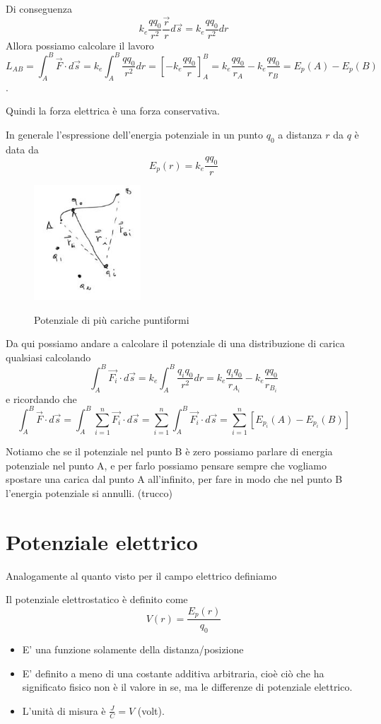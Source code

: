 Di conseguenza 
$$ k_e \frac{qq_0}{r^2}\frac{\vec{r}}{r}d\vec{s}=k_e \frac{qq_0}{r^2}dr$$
Allora possiamo calcolare il lavoro
$$L_{AB}=\int_{A}^{B}\vec{F}\cdot d\vec{s}=k_e \int_{A}^{B}\frac{qq_0}{r^2}dr=\left[ -k_e \frac{qq_0}{r}\right] _A ^B = k_e \frac{qq_0}{r_A}-k_e \frac{qq_0}{r_B}=E_p (A)-E_p(B)$$.

Quindi la forza elettrica è una forza conservativa.

In generale l'espressione dell'energia potenziale in un punto $q_0$ a distanza $r$ da $q$ è data da 
$$E_p (r) =k_e \frac{qq_0}{r}$$

\begin{figure}[h]
	\begin{center}
		\includegraphics[width=4cm]{lezione8/images/3 Elettrostatica, Il potenziale elettrico}\\
		\caption{Potenziale di più cariche puntiformi}
	\end{center}
\end{figure}

Da qui possiamo andare a calcolare il potenziale di una distribuzione di carica qualsiasi calcolando 
$$\int_{A}^{B}\vec{F_i}\cdot d\vec{s}=k_e \int_{A}^{B}\frac{q_i q_0}{r^2}dr = k_e \frac{q_i q_0}{r_{A_i}}-k_e \frac{qq_0}{r_{B_i}}$$ 
e ricordando che 
$$\int_{A}^{B}\vec{F}\cdot d\vec{s}=\int_{A}^{B}\sum_{i=1}^{n}\vec{F_i}\cdot d\vec{s}=\sum_{i=1}^{n}\int_{A}^{B}\vec{F_i}\cdot d\vec{s}=\sum_{i=1}^{n} \left[ E_{p_i}(A)-E_{p_i}(B)\right] $$

Notiamo che se il potenziale nel punto B è zero possiamo parlare di energia potenziale nel punto A, e per farlo possiamo pensare sempre che vogliamo spostare una carica dal punto A all'infinito, per fare in modo che nel punto B l'energia potenziale si annulli. (trucco)
\section{Potenziale elettrico}

Analogamente al quanto visto per il campo elettrico definiamo 

\begin{definizione}
	Il potenziale elettrostatico è definito come 
	$$V(r)=\frac{E_p (r)}{q_0}$$
\end{definizione}
\begin{itemize}
	\item E' una funzione solamente della distanza/posizione
    \item E' definito a meno di una costante additiva arbitraria, cioè ciò che ha significato fisico non è il valore in se, ma le differenze di potenziale elettrico.
    \item L'unità di misura è $\frac{J}{C}=V$ (volt).
\end{itemize}

